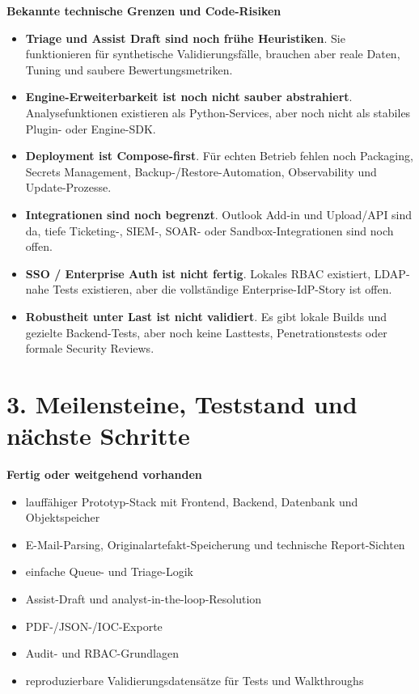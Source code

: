 \documentclass[10pt,a4paper]{article}
\begin{document}
\noindent\textbf{Bekannte technische Grenzen und Code-Risiken}
\begin{itemize}
  \item \textbf{Triage und Assist Draft sind noch frühe Heuristiken}. Sie funktionieren für synthetische Validierungsfälle, brauchen aber reale Daten, Tuning und saubere Bewertungsmetriken.
  \item \textbf{Engine-Erweiterbarkeit ist noch nicht sauber abstrahiert}. Analysefunktionen existieren als Python-Services, aber noch nicht als stabiles Plugin- oder Engine-SDK.
  \item \textbf{Deployment ist Compose-first}. Für echten Betrieb fehlen noch Packaging, Secrets Management, Backup-/Restore-Automation, Observability und Update-Prozesse.
  \item \textbf{Integrationen sind noch begrenzt}. Outlook Add-in und Upload/API sind da, tiefe Ticketing-, SIEM-, SOAR- oder Sandbox-Integrationen sind noch offen.
  \item \textbf{SSO / Enterprise Auth ist nicht fertig}. Lokales RBAC existiert, LDAP-nahe Tests existieren, aber die vollständige Enterprise-IdP-Story ist offen.
  \item \textbf{Robustheit unter Last ist nicht validiert}. Es gibt lokale Builds und gezielte Backend-Tests, aber noch keine Lasttests, Penetrationstests oder formale Security Reviews.
\end{itemize}

\newpage

\section*{3. Meilensteine, Teststand und nächste Schritte}

\noindent\textbf{Fertig oder weitgehend vorhanden}
\begin{itemize}
  \item lauffähiger Prototyp-Stack mit Frontend, Backend, Datenbank und Objektspeicher
  \item E-Mail-Parsing, Originalartefakt-Speicherung und technische Report-Sichten
  \item einfache Queue- und Triage-Logik
  \item Assist-Draft und analyst-in-the-loop-Resolution
  \item PDF-/JSON-/IOC-Exporte
  \item Audit- und RBAC-Grundlagen
  \item reproduzierbare Validierungsdatensätze für Tests und Walkthroughs
\end{itemize}
\end{document}
